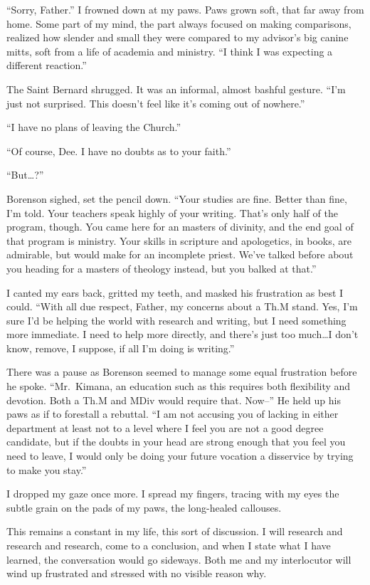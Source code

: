``Sorry, Father.'' I frowned down at my paws. Paws grown soft, that far away from home. Some part of my mind, the part always focused on making comparisons, realized how slender and small they were compared to my advisor's big canine mitts, soft from a life of academia and ministry. ``I think I was expecting a different reaction.''

The Saint Bernard shrugged. It was an informal, almost bashful gesture. ``I'm just not surprised. This doesn't feel like it's coming out of nowhere.''

``I have no plans of leaving the Church.''

``Of course, Dee. I have no doubts as to your faith.''

``But\ldots?''

Borenson sighed, set the pencil down. ``Your studies are fine. Better than fine, I'm told. Your teachers speak highly of your writing. That's only half of the program, though. You came here for an masters of divinity, and the end goal of that program is ministry. Your skills in scripture and apologetics, in books, are admirable, but would make for an incomplete priest. We've talked before about you heading for a masters of theology instead, but you balked at that.''

I canted my ears back, gritted my teeth, and masked his frustration as best I could. ``With all due respect, Father, my concerns about a Th.M stand. Yes, I'm sure I'd be helping the world with research and writing, but I need something more immediate. I need to help more directly, and there's just too much\ldots I don't know, remove, I suppose, if all I'm doing is writing.''

There was a pause as Borenson seemed to manage some equal frustration before he spoke. ``Mr.~Kimana, an education such as this requires both flexibility and devotion. Both a Th.M and MDiv would require that. Now--'' He held up his paws as if to forestall a rebuttal. ``I am not accusing you of lacking in either department at least not to a level where I feel you are not a good degree candidate, but if the doubts in your head are strong enough that you feel you need to leave, I would only be doing your future vocation a disservice by trying to make you stay.''

I dropped my gaze once more. I spread my fingers, tracing with my eyes the subtle grain on the pads of my paws, the long-healed callouses.

This remains a constant in my life, this sort of discussion. I will research and research and research, come to a conclusion, and when I state what I have learned, the conversation would go sideways. Both me and my interlocutor will wind up frustrated and stressed with no visible reason why.

